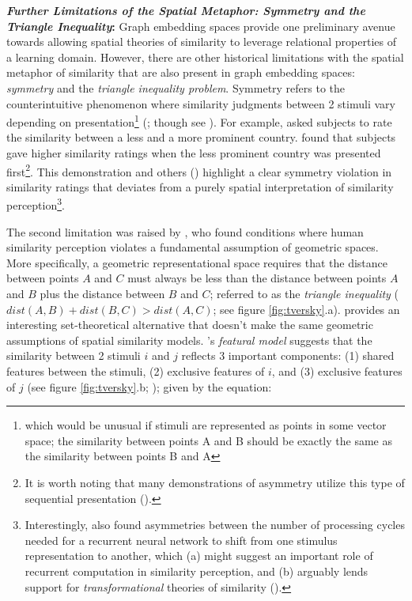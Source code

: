 \documentclass[12pt]{article}
\let\oldcite=\cite
\let\oldtextcite=\textcite
\renewcommand{\cite}[1]{\textcolor[rgb]{0, .121, .388}{\oldcite{#1}}}
\renewcommand{\textcite}[1]{\textcolor[rgb]{0, .121, .388}{\oldtextcite{#1}}}
\begin{document}
\textbf{\emph{Further Limitations of the Spatial Metaphor: Symmetry and the Triangle Inequality}:} Graph embedding spaces provide one preliminary avenue towards allowing spatial theories of similarity to leverage relational properties of a learning domain. However, there are other historical limitations with the spatial metaphor of similarity that are also present in graph embedding spaces: \emph{symmetry} and the \emph{triangle inequality problem}. Symmetry refers to the counterintuitive phenomenon where similarity judgments between 2 stimuli vary depending on presentation\footnote{which would be unusual if stimuli are represented as points in some vector space; the similarity between points A and B should be exactly the same as the similarity between points B and A} (\cite{tversky1977features,holyoak1983social,polk2002rating}; though see \cite{nosofsky1991stimulus}). For example, \textcite{tversky1977features} asked subjects to rate the similarity between a less and a more prominent country. \textcite{tversky1977features} found that subjects gave higher similarity ratings when the less prominent country was presented first\footnote{It is worth noting that many demonstrations of asymmetry utilize this type of sequential presentation (\cite{tversky1977features,polk2002rating}).}. This demonstration and others (\cite{holyoak1983social,polk2002rating}) highlight a clear symmetry violation in similarity ratings that deviates from a purely spatial interpretation of similarity perception\footnote{Interestingly, \textcite{polk2002rating} also found asymmetries between the number of processing cycles needed for a recurrent neural network to shift from one stimulus representation to another, which (a) might suggest an important role of recurrent computation in similarity perception, and (b) arguably lends support for \emph{transformational} theories of similarity (\cite{wiener1980analysis,imai1977pattern}).}.

The second limitation was raised by \textcite{tversky1982similarity}, who found conditions where human similarity perception violates a fundamental assumption of geometric spaces. More specifically, a geometric representational space requires that the distance between points \(A\) and \(C\) must always be less than the distance between points \(A\) and \(B\) plus the distance between \(B\) and \(C\); referred to as the \emph{triangle inequality} (\(dist(A,B) + dist(B,C) > dist(A,C)\); see figure \ref{fig:tversky}.a). \textcite{tversky1977features} provides an interesting set-theoretical alternative that doesn't make the same geometric assumptions of spatial similarity models. \textcite{tversky1977features}'s \emph{featural model} suggests that the similarity between 2 stimuli \(i\) and \(j\) reflects 3 important components: (1) shared features between the stimuli, (2) exclusive features of \(i\), and (3) exclusive features of \(j\) (see figure \ref{fig:tversky}.b; \textcite{tversky1977features,}); given by the equation:
\end{document}
